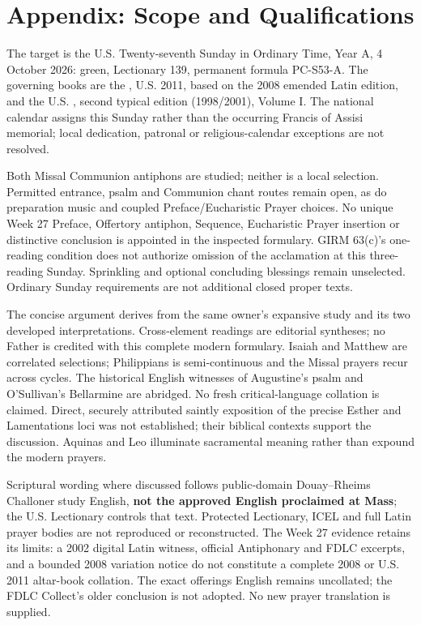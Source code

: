 \clearpage
\section{Appendix: Scope and Qualifications}
The target is the U.S. Twenty-seventh Sunday in Ordinary Time, Year A, 4 October 2026: green, Lectionary 139, permanent formula PC-S53-A. The governing books are the , U.S. 2011, based on the 2008 emended Latin edition, and the U.S. , second typical edition (1998/2001), Volume I. The national calendar assigns this Sunday rather than the occurring Francis of Assisi memorial; local dedication, patronal or religious-calendar exceptions are not resolved.

Both Missal Communion antiphons are studied; neither is a local selection. Permitted entrance, psalm and Communion chant routes remain open, as do preparation music and coupled Preface/Eucharistic Prayer choices. No unique Week 27 Preface, Offertory antiphon, Sequence, Eucharistic Prayer insertion or distinctive conclusion is appointed in the inspected formulary. GIRM 63(c)'s one-reading condition does not authorize omission of the acclamation at this three-reading Sunday. Sprinkling and optional concluding blessings remain unselected. Ordinary Sunday requirements are not additional closed proper texts.

The concise argument derives from the same owner's expansive study and its two developed interpretations. Cross-element readings are editorial syntheses; no Father is credited with this complete modern formulary. Isaiah and Matthew are correlated selections; Philippians is semi-continuous and the Missal prayers recur across cycles. The historical English witnesses of Augustine's psalm and O'Sullivan's Bellarmine are abridged. No fresh critical-language collation is claimed. Direct, securely attributed saintly exposition of the precise Esther and Lamentations loci was not established; their biblical contexts support the discussion. Aquinas and Leo illuminate sacramental meaning rather than expound the modern prayers.

Scriptural wording where discussed follows public-domain Douay--Rheims Challoner study English, \textbf{not the approved English proclaimed at Mass}; the U.S. Lectionary controls that text. Protected Lectionary, ICEL and full Latin prayer bodies are not reproduced or reconstructed. The Week 27 evidence retains its limits: a 2002 digital Latin witness, official Antiphonary and FDLC excerpts, and a bounded 2008 variation notice do not constitute a complete 2008 or U.S. 2011 altar-book collation. The exact offerings English remains uncollated; the FDLC Collect's older conclusion is not adopted. No new prayer translation is supplied.

